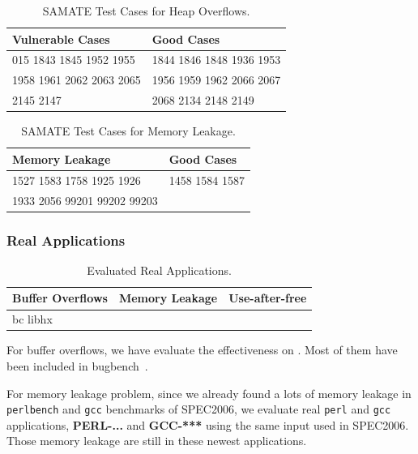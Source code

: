 \begin{table}[!t]
\centering
\begin{tabular}{l|l}
\hline
{\bf \small Vulnerable Cases } & {\bf \small Good Cases} \\
\hline
015 1843 1845 1952 1955 & 1844 1846 1848 1936 1953\\
1958 1961 2062 2063 2065 & 1956 1959 1962 2066 2067 \\
2145 2147 & 2068 2134 2148 2149\\  
\hline
\end{tabular}
\caption{SAMATE Test Cases for Heap Overflows. 
\label{table:SAMATESRDOverflow}}
\end{table}

\begin{table}[!t]
\centering
\begin{tabular}{l|l}
\hline
{\bf \small Memory Leakage } & {\bf \small Good Cases} \\
\hline
1527 1583 1758 1925 1926 & 1458 1584 1587\\
1933 2056 99201 99202 99203 &   \\
\hline
\end{tabular}
\caption{SAMATE Test Cases for Memory Leakage. 
\label{table:SAMATESRDLeak}}
\end{table}


\subsubsection{Real Applications}

\begin{table}[!t]
\centering
\begin{tabular}{l|l|l}
\hline
{\bf \small Buffer Overflows} & {\bf \small Memory Leakage} & {\bf \small Use-after-free}\\
\hline
bc libhx & & \\
\hline
\end{tabular}
\caption{Evaluated Real Applications. 
\label{table:realapps}}
\end{table}

For buffer overflows, we have evaluate the effectiveness on  . Most of them have been included in
bugbench~\cite{}. 

For memory leakage problem, since we already found a lots of memory leakage in \texttt{perlbench}
and \texttt{gcc} benchmarks of SPEC2006, we evaluate real \texttt{perl} and \texttt{gcc} applications, {\bf PERL-... } and {\bf GCC-***} using the same input used in SPEC2006. 
Those memory leakage are still in these newest applications. 

